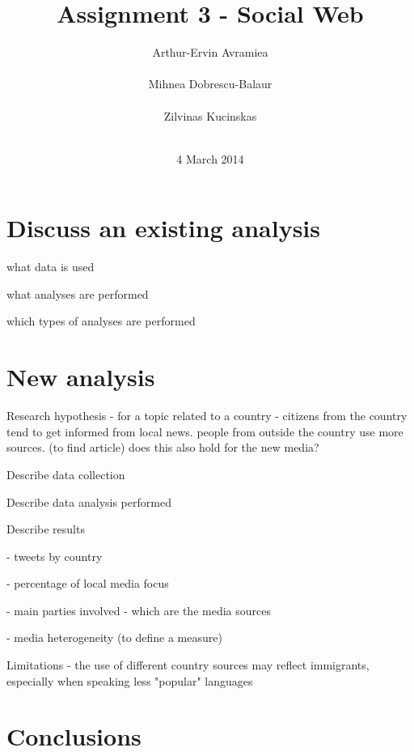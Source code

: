 \documentclass{acm_proc_10ptArticle-sp}
\begin{document}
\title{Assignment 3 - Social Web}

\author{
%
\alignauthor Arthur-Ervin Avramiea\\
       \\
\alignauthor Mihnea Dobrescu-Balaur\\
	\\
\alignauthor Zilvinas Kucinskas\\
	\\
}

\date{4 March 2014}
\maketitle

\section{Discuss an existing analysis}

what data is used

what analyses are performed

which types of analyses are performed


\section{New analysis}

Research hypothesis - for a topic related to a country - citizens from the country tend to get informed from local news. people from outside the country use more sources. (to find article) does this also hold for the new media?

Describe data collection

Describe data analysis performed

Describe results

- tweets by country

- percentage of local media focus

- main parties involved - which are the media sources

- media heterogeneity (to define a measure)

Limitations - the use of different country sources may reflect immigrants, especially when speaking less "popular" languages

\section{Conclusions} 



\end{document}
